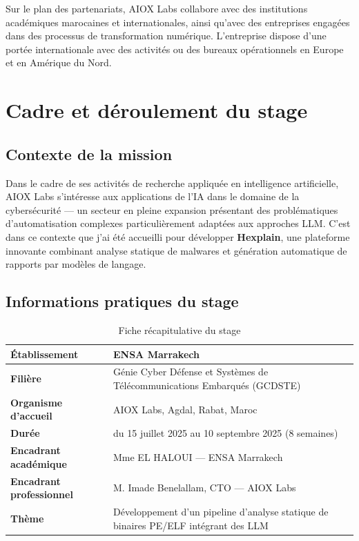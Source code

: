 Sur le plan des partenariats, AIOX Labs collabore avec des institutions académiques marocaines et internationales, ainsi qu'avec des entreprises engagées dans des processus de transformation numérique. L'entreprise dispose d'une portée internationale avec des activités ou des bureaux opérationnels en Europe et en Amérique du Nord.

\section{Cadre et déroulement du stage}

\subsection{Contexte de la mission}

Dans le cadre de ses activités de recherche appliquée en intelligence artificielle, AIOX Labs s'intéresse aux applications de l'IA dans le domaine de la cybersécurité --- un secteur en pleine expansion présentant des problématiques d'automatisation complexes particulièrement adaptées aux approches LLM. C'est dans ce contexte que j'ai été accueilli pour développer \textbf{Hexplain}, une plateforme innovante combinant analyse statique de malwares et génération automatique de rapports par modèles de langage.

\subsection{Informations pratiques du stage}

\begin{table}[H]
  \centering
  \caption{Fiche récapitulative du stage}
  \label{tab:fiche_stage}
  \begin{tabular}{>{\bfseries}p{5cm} p{9cm}}
    \toprule
    Établissement & ENSA Marrakech \\
    \midrule
    Filière & Génie Cyber Défense et Systèmes de Télécommunications Embarqués (GCDSTE) \\
    \midrule
    Organisme d'accueil & AIOX Labs, Agdal, Rabat, Maroc \\
    \midrule
    Durée & du 15 juillet 2025 au 10 septembre 2025 (8 semaines) \\
    \midrule
    Encadrant académique & Mme EL HALOUI --- ENSA Marrakech \\
    \midrule
    Encadrant professionnel & M. Imade Benelallam, CTO --- AIOX Labs \\
    \midrule
    Thème & Développement d'un pipeline d'analyse statique de binaires PE/ELF intégrant des LLM \\
    \bottomrule
  \end{tabular}
\end{table}

